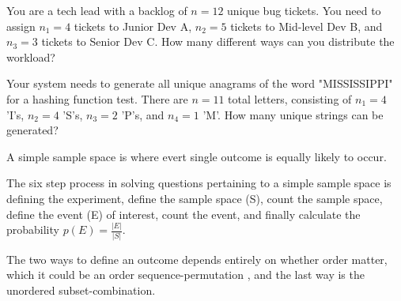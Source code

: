 \documentclass[12pt]{article}
\begin{document}
\begin{enumerate}
You are a tech lead with a backlog of $n=12$ unique bug tickets. You need to assign $n_1=4$ tickets to Junior Dev A, $n_2=5$ tickets to Mid-level Dev B, and $n_3=3$ tickets to Senior Dev C. How many different ways can you distribute the workload?


Your system needs to generate all unique anagrams of the word "MISSISSIPPI" for a hashing function test. There are $n=11$ total letters, consisting of $n_1=4$ 'I's, $n_2=4$ 'S's, $n_3=2$ 'P's, and $n_4=1$ 'M'. How many unique strings can be generated?

\end{enumerate}




\begin{enumerate}


A simple sample space is where evert single outcome is equally likely to occur. 


The six step process in solving questions pertaining to a simple sample space is defining the experiment, define the sample space (S), count the sample space, define the event (E) of interest, count the event, and finally calculate the probability $p(E)= \frac{|E|}{|S|}$. 


The two ways to define an outcome depends entirely on whether order matter, which it could be an order sequence-permutation , and the last way is the unordered subset-combination. 


\end{enumerate}


\end{document}
